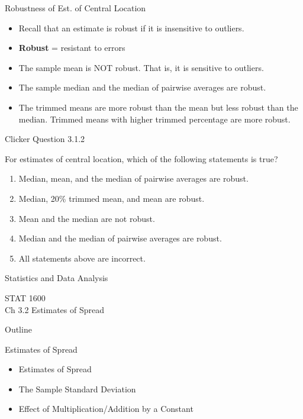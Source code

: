 \documentclass[14pt]{beamer}\usepackage[]{graphicx}\usepackage[]{color}
\begin{document}
\begin{frame}[fragile]{Robustness of Est. of Central Location}

\begin{itemize}
\item Recall that an estimate is robust if it is insensitive to outliers.
\item \textbf{Robust} = resistant to errors
\item The sample mean is NOT robust. That is, it is sensitive to  outliers.
\item The sample median and the median of pairwise averages are  robust.
\item The trimmed means are more robust than the mean but less  robust than the median. Trimmed means with higher trimmed  percentage are more robust.
\end{itemize}
\end{frame}

\begin{frame}[fragile]{Clicker Question 3.1.2}

For estimates of central location, which of the following statements is  true?

\begin{enumerate}
\item Median, mean, and the median of pairwise averages are  robust.
\item Median, 20\% trimmed mean, and mean are robust.
\item Mean and the median are not robust.
\item Median and the median of pairwise averages are robust.
\item All statements above are incorrect.
\end{enumerate}
\end{frame}




\begin{frame}[fragile]{Statistics and Data Analysis}

STAT 1600 \\
Ch 3.2 Estimates of Spread 

\end{frame}

\begin{frame}[fragile]{Outline}

Estimates of Spread  

\begin{itemize}
\item Estimates of Spread
\item The Sample Standard Deviation
\item Effect of Multiplication/Addition by a Constant 
\end{itemize}
\end{frame}
\end{document}
